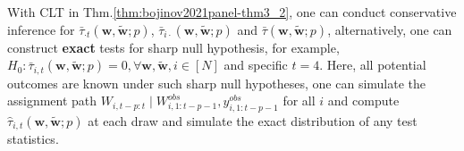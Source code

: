 \documentclass[twoside]{article}
\begin{document}
With CLT in Thm.\ref{thm:bojinov2021panel-thm3_2}, one can conduct conservative inference for $\bar{\tau}_{\cdot t}\left(\mathbf{w},\tilde{\mathbf{w}};p\right)$, $\bar{\tau}_{i \cdot}\left(\mathbf{w},\tilde{\mathbf{w}};p\right)$ and $\bar{\tau}\left(\mathbf{w},\tilde{\mathbf{w}};p\right)$, alternatively, one can construct \textbf{exact} tests for sharp null hypothesis, for example, $H_0:\bar{\tau}_{i, t}\left(\mathbf{w},\tilde{\mathbf{w}};p\right)=0,\forall \mathbf{w},\tilde{\mathbf{w}},i\in[N]$ and specific $t=4$. 
Here, all potential outcomes are known under such sharp null hypotheses, one can simulate the assignment path $W_{i,t-p:t}\mid W^{obs}_{i,1:t-p-1},y^{obs}_{i,1:t-p-1}$ for all $i$ and compute $\hat{\tau}_{i,t}\left(\mathbf{w},\tilde{\mathbf{w}};p\right)$ at each draw and simulate the exact distribution of any test statistics.
\end{document}
